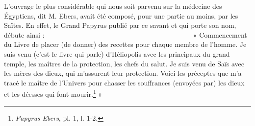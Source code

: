 \documentclass[a4paper, 11pt, oneside]{article}
\newcommand*\hieroglyhicsAAAD{}
\newcommand*\hieroglyhicsAAAG{}
\newcommand*\hieroglyhicsAAAH{}
\newcommand*\hieroglyhicsAAAQ{}
\newcommand*\hieroglyhicsAAAU{}
\newcommand*\hieroglyhicsAAAW{\raisebox{0.5ex}{}}
\newcommand*\hieroglyhicsAABM{}
\newcommand*\hieroglyhicsAABN{}
\newcommand*\hieroglyhicsAABR{}
\newcommand*\hieroglyhicsAACB{\raisebox{0.5ex}{}}
\newcommand*\hieroglyhicsAACM{}
\newcommand*\hieroglyhicsAACS{}
\newcommand*\hieroglyhicsAADB{}
\newcommand*\hieroglyhicsAADC{\raisebox{0.5ex}{}}
\newcommand*\hieroglyhicsAADF{}
\newcommand*\hieroglyhicsAADU{}
\newcommand*\hieroglyhicsAAEC{}
\newcommand*\hieroglyhicsAAEF{}
\newcommand*\hieroglyhicsAAEK{}
\newcommand*\hieroglyhicsAAEL{}
\newcommand*\hieroglyhicsAAEP{\raisebox{0.5ex}{}}
\newcommand*\hieroglyhicsAAEZ{}
\newcommand*\hieroglyhicsAAFQ{}
\newcommand*\hieroglyhicsAAFS{}
\newcommand*\hieroglyhicsAAHT{}
\newcommand*\hieroglyhicsAAHY{}
\newcommand*\hieroglyhicsAAJW{}
\newcommand*\hieroglyhicsAAJX{}
\newcommand*\hieroglyhicsAAJY{}
\newcommand*\hieroglyhicsAAJZ{}
\newcommand*\hieroglyhicsAAKA{}
\newcommand*\hieroglyhicsAAKB{}
\newcommand*\hieroglyhicsAAKC{}
\newcommand*\hieroglyhicsAAKD{}
\newcommand*\hieroglyhicsAAKE{}
\newcommand*\hieroglyhicsAAKF{}
\newcommand*\hieroglyhicsAAKG{}
\newcommand*\hieroglyhicsAAKH{}
\newcommand*\hieroglyhicsAAKI{}
\newcommand*\hieroglyhicsAAKJ{}
\newcommand*\hieroglyhicsAAKK{\raisebox{0.5ex}{}}
\newcommand*\hieroglyhicsAAKL{}
\newcommand*\hieroglyhicsAAKM{}
\newcommand*\hieroglyhicsAAKN{}
\newcommand*\hieroglyhicsAAKO{}
\newcommand*\hieroglyhicsAAKP{}
\newcommand*\hieroglyhicsAAKQ{}
\newcommand*\hieroglyhicsAAKR{}
\newcommand*\hieroglyhicsAAKS{}
\newcommand*\hieroglyhicsAAKT{}
\newcommand*\hieroglyhicsAAKU{}
\newcommand*\hieroglyhicsAAKV{}
\newcommand*\hieroglyhicsAAKW{}
\newcommand*\hieroglyhicsAAKX{}
\newcommand*\hieroglyhicsAAKY{}
\newcommand*\hieroglyhicsAAKZ{}
\newcommand*\hieroglyhicsAALA{}
\newcommand*\hieroglyhicsAALB{}
\newcommand*\hieroglyhicsAALC{}
\begin{document}
L'ouvrage le plus considérable qui nous soit parvenu sur la médecine des Égyptiens, dit M. Ebers, avait été composé, pour une partie au moins, par les Saïtes. En effet, le Grand Papyrus publié par ce savant et qui porte son nom, débute ainsi : $\hieroglyhicsAAJW\:\hieroglyhicsAABR\:\hieroglyhicsAAJX\allowbreak\:\hieroglyhicsAAJY\:\hieroglyhicsAAEZ\:\hieroglyhicsAAJZ\allowbreak\:\hieroglyhicsAAKA\:\hieroglyhicsAAKB\:\hieroglyhicsAAEC\allowbreak\:\hieroglyhicsAAKC\:\hieroglyhicsAAFS\:\hieroglyhicsAAAQ\allowbreak\:\hieroglyhicsAAKD\:\hieroglyhicsAADU\:\hieroglyhicsAAKE\allowbreak\:\hieroglyhicsAABR\:\hieroglyhicsAAEL\:\hieroglyhicsAAKF\allowbreak\:\hieroglyhicsAAEZ\:\hieroglyhicsAAHT\:\hieroglyhicsAAFQ\allowbreak\:\hieroglyhicsAADC\:\hieroglyhicsAADB\:\hieroglyhicsAAEF\allowbreak\:\hieroglyhicsAAKG\:\hieroglyhicsAABN\:\hieroglyhicsAAAU\allowbreak\:\hieroglyhicsAADB\:\hieroglyhicsAAEF\:\hieroglyhicsAAKH\allowbreak\:\hieroglyhicsAABR\:\hieroglyhicsAAKI\:\hieroglyhicsAAKJ\allowbreak\:\hieroglyhicsAABM\:\hieroglyhicsAAKK\:\hieroglyhicsAADC\allowbreak\:\hieroglyhicsAADB\:\hieroglyhicsAAEF\:\hieroglyhicsAAKL\allowbreak\:\hieroglyhicsAABR\:\hieroglyhicsAAKM\:\hieroglyhicsAADU\allowbreak\:\hieroglyhicsAAKE\:\hieroglyhicsAABR\:\hieroglyhicsAAAD\allowbreak\:\hieroglyhicsAAAG\:\hieroglyhicsAADC\:\hieroglyhicsAAAW\allowbreak\:\hieroglyhicsAAEZ\:\hieroglyhicsAAKN\:\hieroglyhicsAAKO\allowbreak\:\hieroglyhicsAAKP\:\hieroglyhicsAADB\:\hieroglyhicsAAEF\allowbreak\:\hieroglyhicsAAEK\:\hieroglyhicsAAEK\:\hieroglyhicsAAEK\allowbreak\:\hieroglyhicsAADB\:\hieroglyhicsAAEF\:\hieroglyhicsAAKQ\allowbreak\:\hieroglyhicsAACS\:\hieroglyhicsAAKR\:\hieroglyhicsAAKE\allowbreak\:\hieroglyhicsAABR\:\hieroglyhicsAAKI\:\hieroglyhicsAAKJ\allowbreak\:\hieroglyhicsAAEF\:\hieroglyhicsAACS\:\hieroglyhicsAAKR\allowbreak\:\hieroglyhicsAAAH\:\hieroglyhicsAACM\:\hieroglyhicsAAKS\allowbreak\:\hieroglyhicsAADC\:\hieroglyhicsAADF\:\hieroglyhicsAAEF\allowbreak\:\hieroglyhicsAAKE\:\hieroglyhicsAAKT\:\hieroglyhicsAAKU\allowbreak\:\hieroglyhicsAAKV\:\hieroglyhicsAADB\:\hieroglyhicsAAEP\allowbreak\:\hieroglyhicsAAKW\:\hieroglyhicsAAHY\:\hieroglyhicsAAKX\allowbreak\:\hieroglyhicsAAKY\:\hieroglyhicsAAEK\:\hieroglyhicsAADB\allowbreak\:\hieroglyhicsAAEK\:\hieroglyhicsAAKZ\:\hieroglyhicsAALA\allowbreak\:\hieroglyhicsAALB\:\hieroglyhicsAALC\allowbreak\:\hieroglyhicsAALB\:\hieroglyhicsAALC\:\hieroglyhicsAACB$ « Commencement du Livre de placer (de donner) des recettes pour chaque membre de l'homme. Je suis venu (c'est le livre qui parle) d'Héliopolis avec les principaux du grand temple, les maîtres de la protection, les chefs du salut. Je suis venu de Saïs avec les mères des dieux, qui m'assurent leur protection. Voici les préceptes que m'a tracé le maître de l'Univers pour chasser les souffrances (envoyées par) les dieux et les déesses qui font mourir.\footnote{\emph{Papyrus Ebers}, pl. 1, l. 1-2.} »
\end{document}
